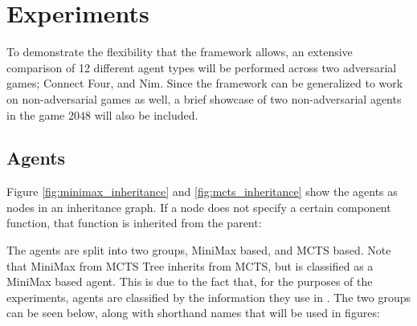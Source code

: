 \section{Experiments}

To demonstrate the flexibility that the framework allows, an extensive comparison of 12 different agent types will be performed across two
adversarial games; Connect Four, and Nim. Since the framework can be generalized to work on non-adversarial games as well, a brief showcase of two non-adversarial agents in the game 2048 will also be included.

\subsection{Agents}

Figure \ref{fig:minimax_inheritance} and \ref{fig:mcts_inheritance} show the agents as nodes in an inheritance graph. If a node does not specify a certain component function, that function is inherited from the parent:





The agents are split into two groups, MiniMax based, and MCTS based. Note that MiniMax from MCTS Tree inherits from MCTS, but is classified as a MiniMax based agent. This is due to the fact that, for the purposes of the experiments, agents are classified by the information they use in \gbm. The two groups can be seen below, along with shorthand names that will be used in figures:


